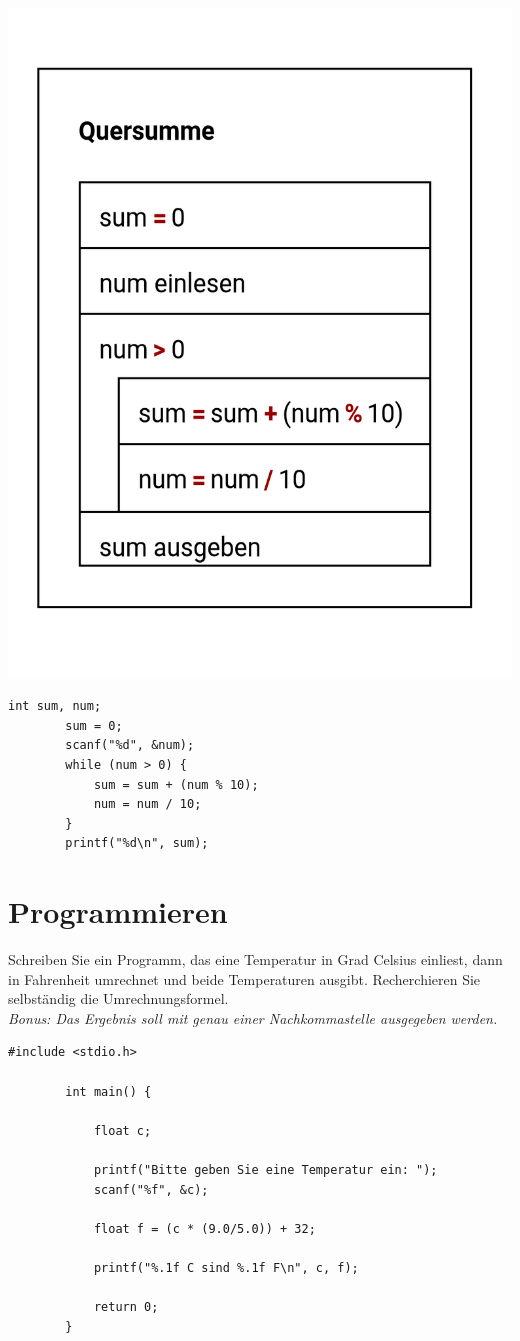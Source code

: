 \documentclass[]{article}
\begin{document}
	\begin{multicols}{2}
	\includegraphics[scale=0.2]{figures/Quersumme}
	\columnbreak
	\begin{lstlisting}[gobble=4]
		int sum, num;
		sum = 0;
		scanf("%d", &num);
		while (num > 0) {
			sum = sum + (num % 10);
			num = num / 10;
		}
		printf("%d\n", sum);
	\end{lstlisting}
	\end{multicols}
	
	\section{Programmieren}
	
	Schreiben Sie ein Programm, das eine Temperatur in Grad Celsius einliest, dann in Fahrenheit umrechnet und beide Temperaturen ausgibt.
	Recherchieren Sie selbständig die Umrechnungsformel.\\
	\textit{Bonus: Das Ergebnis soll mit genau einer Nachkommastelle ausgegeben werden.}
	
	\begin{lstlisting}[gobble=4]
		#include <stdio.h>
		
		int main() {
		
			float c;
			
			printf("Bitte geben Sie eine Temperatur ein: ");
			scanf("%f", &c);
			
			float f = (c * (9.0/5.0)) + 32;
			
			printf("%.1f C sind %.1f F\n", c, f);
			
			return 0;
		}
	\end{lstlisting}
	
\end{document}
